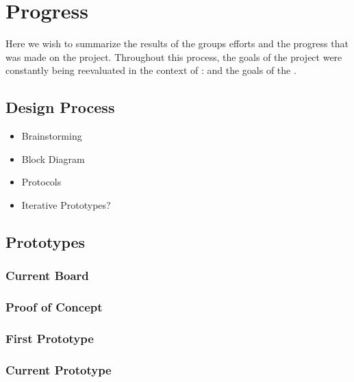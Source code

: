 \section{Progress}
Here we wish to summarize the results of the groups efforts and the progress that was made on the \netlets project.  Throughout this process, the goals of the project were constantly being reevaluated in the context of \course: \coursetitle and the goals of the \brownengn.

\subsection{Design Process}
	\begin{itemize}
		\item Brainstorming
		\item Block Diagram
	 	\item Protocols
		\item Iterative Prototypes?
	\end{itemize}
\subsection{Prototypes}
\subsubsection{Current Board}
\subsubsection{Proof of Concept}
\subsubsection{First Prototype}
\subsubsection{Current Prototype}